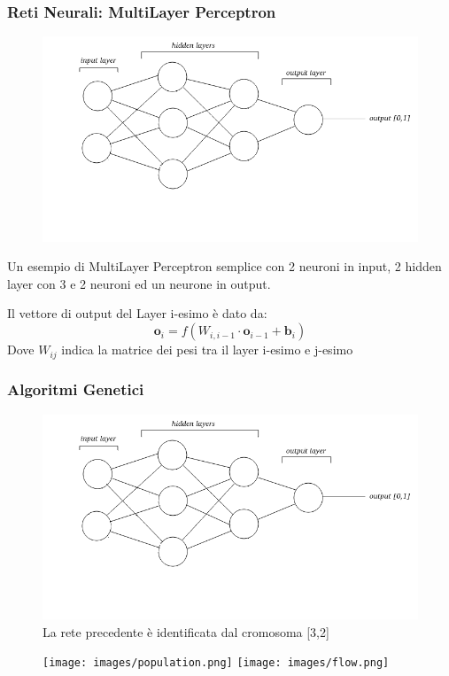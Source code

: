 \documentclass{beamer}
\begin{document}
\begin{frame}
\frametitle{Reti Neurali: MultiLayer Perceptron}
 \begin{figure}
  \includegraphics[scale = 0.4]{images/MLPClass.png}
 \end{figure}
 Un esempio di MultiLayer Perceptron semplice con 2 neuroni in input, 2 hidden layer con 3 e 2 neuroni ed un neurone in output.
 
 Il vettore di output del Layer i-esimo è dato da:
 $$\textbf{o}_i = f(W_{i,i-1}\cdot \textbf{o}_{i-1} + \textbf{b}_i)$$
 Dove $W_{ij}$ indica la matrice dei pesi tra il layer i-esimo e j-esimo

\end{frame}

\begin{frame}
 \frametitle{Algoritmi Genetici}
 \begin{figure}[H]
  \centering
  \includegraphics[scale = 0.2]{images/MLPClass.png}
  \caption{La rete precedente è identificata dal cromosoma [3,2]}
 \end{figure}

 \begin{figure}
  \texttt{[image: images/population.png]}
  \texttt{[image: images/flow.png]}
 \end{figure}
\end{frame}
\end{document}
